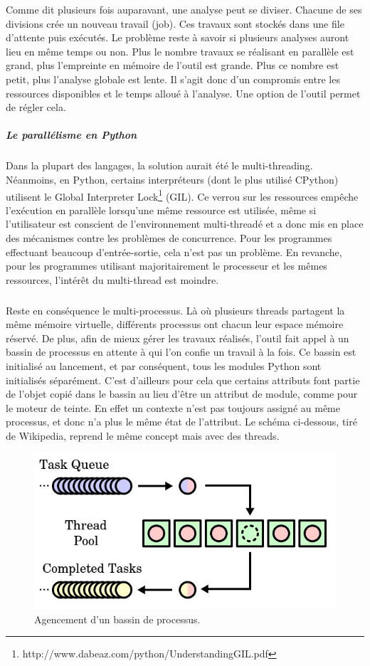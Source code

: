 Comme dit plusieurs fois auparavant, une analyse peut se diviser. Chacune de ses divisions crée un nouveau travail (job). Ces travaux sont stockés dans une file d'attente
puis exécutés. Le problème reste à savoir si plusieurs analyses auront lieu en même temps ou non. Plus le nombre travaux se réalisant en parallèle est grand, plus l'empreinte en mémoire de l'outil
est grande. Plus ce nombre est petit, plus l'analyse globale est lente. Il s'agit donc d'un compromis entre les ressources disponibles et le temps alloué à l'analyse. Une option de l'outil permet
de régler cela.
\subparagraph{Le parallélisme en Python}
Dans la plupart des langages, la solution aurait été le multi-threading. Néanmoins, en Python, certains interpréteurs (dont le plus utilisé CPython) utilisent le Global Interpreter Lock\footnote{http://www.dabeaz.com/python/UnderstandingGIL.pdf} (GIL).
Ce verrou sur les ressources empêche l'exécution en parallèle lorsqu'une même ressource est utilisée, même si l'utilisateur est conscient de l'environnement multi-threadé et a donc mis en place
des mécanismes contre les problèmes de concurrence. Pour les programmes effectuant beaucoup d'entrée-sortie, cela n'est pas un problème. En revanche, pour les programmes utilisant majoritairement
le processeur et les mêmes ressources, l'intérêt du multi-thread est moindre.
\subparagraph{}
Reste en conséquence le multi-processus. Là où plusieurs threads partagent la même mémoire virtuelle, différents processus ont chacun leur espace mémoire réservé. De plus,
afin de mieux gérer les travaux réalisés, l'outil fait appel à un bassin de processus en attente à qui l'on confie un travail à la fois. Ce bassin est initialisé au lancement,
et par conséquent, tous les modules Python sont initialisés séparément. C'est d'ailleurs pour cela que certains attributs font partie de l'objet copié dans le bassin au lieu d'être
un attribut de module, comme pour le moteur de teinte. En effet un contexte n'est pas toujours assigné au même processus, et donc n'a plus le même état de l'attribut.
Le schéma ci-dessous, tiré de Wikipedia, reprend le même concept mais avec des threads.
\begin{figure}[h]
    \centering
    \includegraphics[scale=0.5]{images/threadpool.png}\newline
    \caption{Agencement d'un bassin de processus.}
\end{figure}

